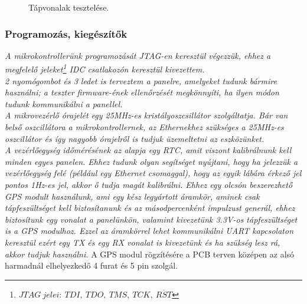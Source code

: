 \documentclass[a4paper, 12pt]{article}
\newcommand{\tab}{\hspace*{1em}}
\begin{document}
\begin{figure}[H]
    \centering
    \caption{Tápvonalak tesztelése.}
\end{figure}




\subsubsection{Programozás, kiegészítők}
\emph{ \tab A mikrokontrollerünk programozását JTAG-en keresztül végezzük, ehhez a megfelelő jeleket\footnote{$JTAG\ jelei:\ TDI,\ TDO,\ TMS,\ TCK,\ \overline{RST}$} IDC csatlakozón keresztül kivezettem.\\
2 nyomógombot és 3 ledet is terveztem a panelre, amelyeket tudunk bármire használni; a teszter firmware-ének ellenőrzését megkönnyíti, ha ilyen módon tudunk kommunikálni a panellel.\\
A mikrovezérlő órajelét egy 25MHz-es kristályoszcsillátor szolgáltatja. Bár van belső oszcillátora a mikrokontrollernek, az Ethernekhez szükséges a 25MHz-es oszcillátor és így nagyobb órajelről is tudjuk üzemeltetni az eszközünket.\\
A vezérlőegység időmérésének az alapja egy RTC, amit viszont kalibrálnunk kell minden egyes panelen. Ehhez tudunk olyan segítséget nyújtani, hogy ha jelezzük a vezérlőegység felé (például egy Ethernet csomaggal), hogy az egyik lábára érkező jel pontos 1Hz-es jel, akkor ő tudja magát kalibrálni. Ehhez egy olcsón beszerezhető GPS modult használunk, ami egy kész legyártott áramkör, aminek csak tápfeszültséget kell biztosítanunk és az másodpercenként impulzust generál, ehhez biztosítunk egy vonalat a panelünkön, valamint kivezetünk 3.3V-os tápfeszültséget is a GPS modulhoz. Ezzel az áramkörrel lehet kommunikálni UART kapcsolaton keresztül ezért egy TX és egy RX vonalat is kivezetünk és ha szükség lesz rá, akkor tudjuk használni.} A GPS modul rögzítésére a PCB terven középen az alsó harmadnál elhelyezkedő 4 furat és 5 pin szolgál.
\end{document}
